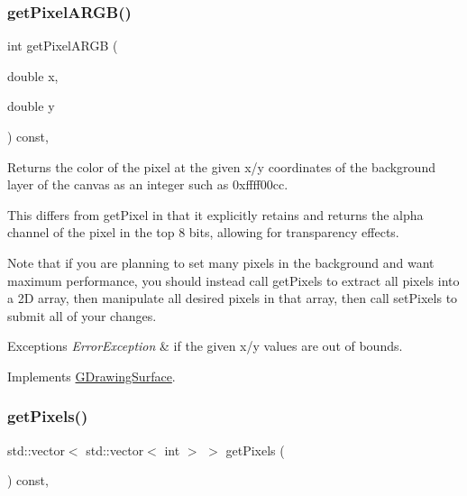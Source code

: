 \subsubsection{\texorpdfstring{get\+Pixel\+A\+R\+G\+B()}{getPixelARGB()}}
{\footnotesize\ttfamily int get\+Pixel\+A\+R\+GB (\begin{DoxyParamCaption}\item[{double}]{x,  }\item[{double}]{y }\end{DoxyParamCaption}) const\hspace{0.3cm}{\ttfamily [override]}, {\ttfamily [virtual]}}



Returns the color of the pixel at the given x/y coordinates of the background layer of the canvas as an integer such as 0xffff00cc. 

This differs from get\+Pixel in that it explicitly retains and returns the alpha channel of the pixel in the top 8 bits, allowing for transparency effects.

Note that if you are planning to set many pixels in the background and want maximum performance, you should instead call get\+Pixels to extract all pixels into a 2D array, then manipulate all desired pixels in that array, then call set\+Pixels to submit all of your changes.


\begin{DoxyExceptions}{Exceptions}
{\em Error\+Exception} & if the given x/y values are out of bounds. \\
\hline
\end{DoxyExceptions}


Implements \mbox{\hyperlink{classsgl_1_1GDrawingSurface_aee10de1ca7da1fc3f3fc0e48286f88f8}{G\+Drawing\+Surface}}.

\mbox{\label{classsgl_1_1GCanvas_a41bea2a0b9f562b69f754a8b9bf4e711}} 
\subsubsection{\texorpdfstring{get\+Pixels()}{getPixels()}}
{\footnotesize\ttfamily std\+::vector$<$ std\+::vector$<$ int $>$ $>$ get\+Pixels (\begin{DoxyParamCaption}{ }\end{DoxyParamCaption}) const\hspace{0.3cm}{\ttfamily [override]}, {\ttfamily [virtual]}}



